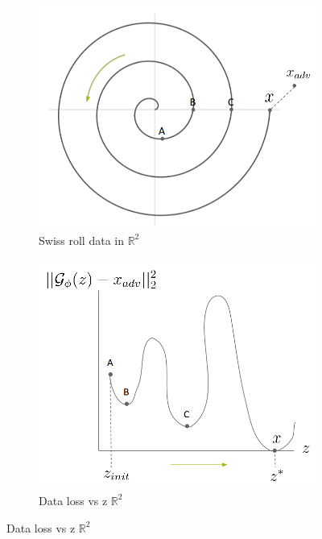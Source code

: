 \documentclass[twoside]{article}
\theoremstyle{definition}
\begin{document}
\begin{figure}
\begin{subfigure}{0.5\textwidth}
    \caption{Swiss roll data in $\mathbb{R}^2$}
    \centering
    \includegraphics[scale=0.25]{./swiss.png}
\end{subfigure}%
\begin{subfigure}{0.5\textwidth}  %
    \caption{Data loss vs z $\mathbb{R}^2$}
    \centering
    \includegraphics[scale=0.25]{./loss_swiss.png}
\end{subfigure}
\end{figure}
\end{document}
